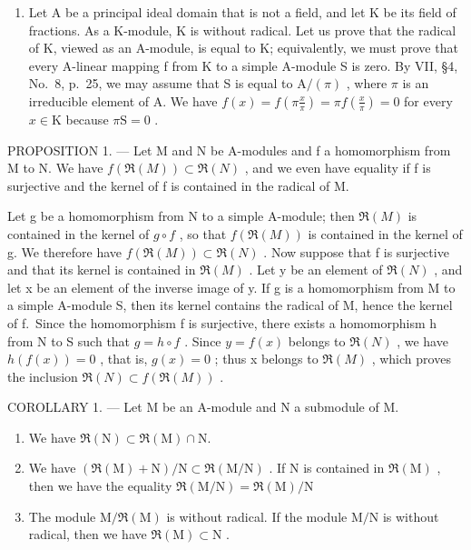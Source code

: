 \begin{enumerate}
\def\labelenumi{\arabic{enumi})}
\setcounter{enumi}{1}
\tightlist
\item
  Let A be a principal ideal domain that is not a field, and let K be its field of fractions. As a K-module, K is without radical. Let us prove that the radical of K, viewed as an A-module, is equal to K; equivalently, we must prove that every A-linear mapping f from K to a simple A-module S is zero. By VII, §4, No.~8, p.~25, we may assume that S is equal to \(\mathrm{A}/(\pi)\) , where \(\pi\) is an irreducible element of A. We have \(f(x) = f\left(\pi \frac{x}{\pi}\right) = \pi f\left(\frac{x}{\pi}\right) = 0\) for every \(x \in \mathrm{K}\) because \(\pi \mathrm{S} = 0\) .
\end{enumerate}

PROPOSITION 1. --- Let M and N be A-modules and f a homomorphism from M to N. We have \(f(\mathfrak{R}(M)) \subset \mathfrak{R}(N)\) , and we even have equality if f is surjective and the kernel of f is contained in the radical of M.

Let g be a homomorphism from N to a simple A-module; then \(\mathfrak{R}(M)\) is contained in the kernel of \(g \circ f\) , so that \(f(\mathfrak{R}(M))\) is contained in the kernel of g. We therefore have \(f(\mathfrak{R}(M)) \subset \mathfrak{R}(N)\) . Now suppose that f is surjective and that its kernel is contained in \(\mathfrak{R}(M)\) . Let y be an element of \(\mathfrak{R}(N)\) , and let x be an element of the inverse image of y. If g is a homomorphism from M to a simple A-module S, then its kernel contains the radical of M, hence the kernel of f.~Since the homomorphism f is surjective, there exists a homomorphism h from N to S such that \(g = h \circ f\) . Since \(y = f(x)\) belongs to \(\mathfrak{R}(N)\) , we have \(h(f(x)) = 0\) , that is, \(g(x) = 0\) ; thus x belongs to \(\mathfrak{R}(M)\) , which proves the inclusion \(\mathfrak{R}(N) \subset f(\mathfrak{R}(M))\) .

COROLLARY 1. --- Let M be an A-module and N a submodule of M.

\begin{enumerate}
\def\labelenumi{\alph{enumi})}
\item
  We have \(\Re (\mathrm{N})\subset \Re (\mathrm{M})\cap \mathrm{N}.\)
\item
  We have \((\Re (\mathrm{M}) + \mathrm{N}) / \mathrm{N}\subset \Re (\mathrm{M} / \mathrm{N})\) . If N is contained in \(\Re (\mathrm{M})\) , then we have the equality \(\Re (\mathrm{M} / \mathrm{N}) = \Re (\mathrm{M}) / \mathrm{N}\)
\item
  The module \(\mathrm{M} / \Re (\mathrm{M})\) is without radical. If the module \(\mathrm{M} / \mathrm{N}\) is without radical, then we have \(\Re (\mathrm{M})\subset \mathrm{N}\) .
\end{enumerate}

